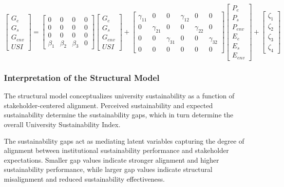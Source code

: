 \documentclass[11pt,a4paper]{article}
\begin{document}
\begin{equation}
\begin{bmatrix}
G_e \\
G_s \\
G_{env} \\
USI
\end{bmatrix}
=
\begin{bmatrix}
0 & 0 & 0 & 0 \\
0 & 0 & 0 & 0 \\
0 & 0 & 0 & 0 \\
\beta_1 & \beta_2 & \beta_3 & 0
\end{bmatrix}
\begin{bmatrix}
G_e \\
G_s \\
G_{env} \\
USI
\end{bmatrix}
+
\begin{bmatrix}
\gamma_{11} & 0 & 0 & \gamma_{12} & 0 & 0 \\
0 & \gamma_{21} & 0 & 0 & \gamma_{22} & 0 \\
0 & 0 & \gamma_{31} & 0 & 0 & \gamma_{32} \\
0 & 0 & 0 & 0 & 0 & 0
\end{bmatrix}
\begin{bmatrix}
P_e \\
P_s \\
P_{env} \\
E_e \\
E_s \\
E_{env}
\end{bmatrix}
+
\begin{bmatrix}
\zeta_1 \\
\zeta_2 \\
\zeta_3 \\
\zeta_4
\end{bmatrix}
\end{equation}

\subsubsection{Interpretation of the Structural Model}

The structural model conceptualizes university sustainability as a function of stakeholder-centered alignment. Perceived sustainability and expected sustainability determine the sustainability gaps, which in turn determine the overall University Sustainability Index.

The sustainability gaps act as mediating latent variables capturing the degree of alignment between institutional sustainability performance and stakeholder expectations. Smaller gap values indicate stronger alignment and higher sustainability performance, while larger gap values indicate structural misalignment and reduced sustainability effectiveness.
\end{document}
